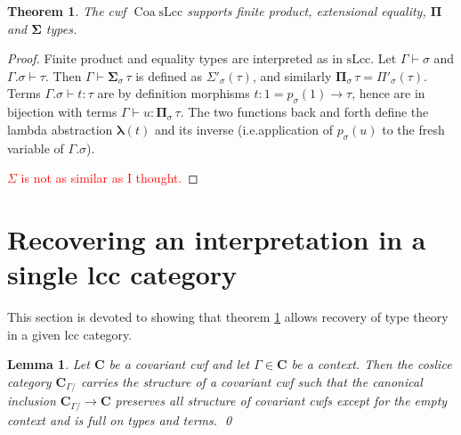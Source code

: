 \documentclass{article}
\newcommand{\todo}[1]{\textcolor{red}{#1}}
\newtheorem{theorem}{Theorem}
\newtheorem{lemma}{Lemma}
\theoremstyle{remark}
\theoremstyle{definition}
\begin{document}
\begin{theorem}
  \label{th:lcc-supports-types}
  The cwf $\operatorname{Coa} \mathrm{sLcc}$ supports finite product, extensional equality, $\mathbf{\Pi}$ and $\mathbf{\Sigma}$ types.
\end{theorem}
\begin{proof}
  Finite product and equality types are interpreted as in $\mathrm{sLcc}$.
  Let $\Gamma \vdash \sigma$ and $\Gamma.\sigma \vdash \tau$.
  Then $\Gamma \vdash \mathbf{\Sigma}_\sigma \, \tau$ is defined as $\Sigma'_\sigma(\tau)$, and similarly $\mathbf{\Pi}_\sigma \, \tau = \Pi'_\sigma(\tau)$.
  Terms $\Gamma.\sigma \vdash t: \tau$ are by definition morphisms $t : 1 = p_\sigma(1) \rightarrow \tau$, hence are in bijection with terms $\Gamma \vdash u: \mathbf{\Pi}_\sigma \, \tau$.
  The two functions back and forth define the lambda abstraction $\mathbf{\lambda}(t)$ and its inverse (i.e.\@ application of $p_\sigma(u)$ to the fresh variable of $\Gamma.\sigma$).

  \todo{$\Sigma$ is not as similar as I thought.}



\end{proof}

\section{Recovering an interpretation in a single lcc category}

This section is devoted to showing that theorem \ref{th:lcc-supports-types} allows recovery of type theory in a given lcc category.

\begin{lemma}
  Let $\mathbf{C}$ be a covariant cwf and let $\Gamma \in \mathbf{C}$ be a context.
  Then the coslice category $\mathbf{C}_{\Gamma /}$ carries the structure of a covariant cwf such that the canonical inclusion $\mathbf{C}_{\Gamma /} \rightarrow \mathbf{C}$ preserves all structure of covariant cwfs except for the empty context and is full on types and terms.
  \qed
\end{lemma}
\end{document}
